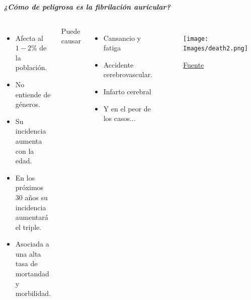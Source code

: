 
\begin{frame}
    \begin{center}
                {\Large \color{TurkishRose}\textbf{\textit{¿Cómo de peligrosa es la fibrilación auricular?}}} 
    \end{center}
    \pause
    \begin{columns}
        
        \centering
            \vspace{-2cm}
            \begin{itemize}
                \item Afecta al $1-2\%$ de la población.
                \item No entiende de géneros.
                \item Su incidencia aumenta con la edad.
                \item En los próximos 30 años su incidencia aumentará el triple.
                \item Asociada a una alta tasa de mortandad y morbilidad.
            \end{itemize}
        \pause
        \centering
            {\hspace{-2.5cm}Puede causar} \\
            \begin{itemize}
                \item Cansancio y fatiga
                \item Accidente cerebrovascular.
                \item Infarto cerebral
                \item Y en el peor de los casos...
            \end{itemize}
            \pause 
            \begin{figure}
                \centering
                \texttt{[image: Images/death2.png]}
                \caption{\href{https://javieres.com/wp-content/uploads/2022/04/LOGOERDGERTF.png}{Fuente}}
            \end{figure}

            
    \end{columns}
\end{frame}


